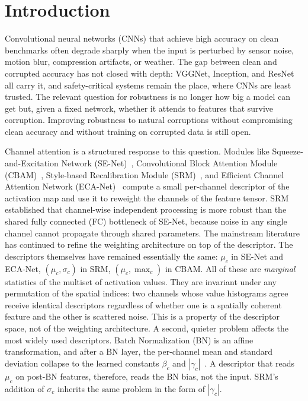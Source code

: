 \documentclass{bmvc2k}
\begin{document}
\section{Introduction}
\label{sec:intro}
Convolutional neural networks (CNNs) that achieve high accuracy on clean benchmarks often degrade sharply when the input is perturbed by sensor noise, motion blur, compression artifacts, or weather. The gap between clean and corrupted accuracy has not closed with depth: VGGNet, Inception, and ResNet~\cite{he2016deep} all carry it, and safety-critical systems remain the place, where CNNs are least trusted. The relevant question for robustness is no longer how big a model can get but, given a fixed network, whether it attends to features that survive corruption. Improving robustness to natural corruptions without compromising clean accuracy and without training on corrupted data is still open.

Channel attention is a structured response to this question. Modules like Squeeze-and-Excitation Network (SE-Net)~\cite{hu2018squeeze}, Convolutional Block Attention Module (CBAM)~\cite{woo2018cbam}, Style-based Recalibration Module (SRM)~\cite{lee2020srm}, and Efficient Channel Attention Network (ECA-Net)~\cite{wang2020eca} compute a small per-channel descriptor of the activation map and use it to reweight the channels of the feature tensor. SRM established that channel-wise independent processing is more robust than the shared fully connected (FC) bottleneck of SE-Net, because noise in any single channel cannot propagate through shared parameters. The mainstream literature has continued to refine the weighting architecture on top of the descriptor. The descriptors themselves have remained essentially the same: $\mu_c$ in SE-Net and ECA-Net, $(\mu_c, \sigma_c)$ in SRM, $(\mu_c, \max_c)$ in CBAM. All of these are \emph{marginal} statistics of the multiset of activation values. They are invariant under any permutation of the spatial indices: two channels whose value histograms agree receive identical descriptors regardless of whether one is a spatially coherent feature and the other is scattered noise. This is a property of the descriptor space, not of the weighting architecture. A second, quieter problem affects the most widely used descriptors. Batch Normalization (BN) is an affine transformation, and after a BN layer, the per-channel mean and standard deviation collapse to the learned constants $\beta_c$ and $|\gamma_c|$~\cite{xu2021ela}. A descriptor that reads $\mu_c$ on post-BN features, therefore, reads the BN bias, not the input. SRM's addition of $\sigma_c$ inherits the same problem in the form of $|\gamma_c|$.
\end{document}
